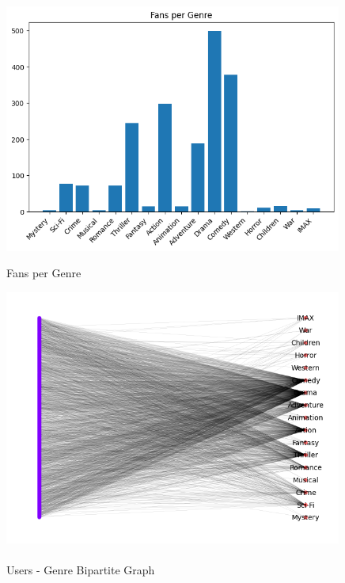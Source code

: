 \documentclass[12pt]{article}
\numberwithin{equation}{section}
\begin{document}
\begin{figure}[h!]
    \begin{minipage}[b]{0.49\linewidth}
         \centering
  	\includegraphics[width=0.99\textwidth]{fans_per_genre.png}
  	\label{fig:fanspergenre}
	 \caption{Fans per Genre}
    \end{minipage}
    \hspace{0.01 cm}
    \begin{minipage}[b]{0.49\linewidth}
         \centering
  	\includegraphics[width=0.99\textwidth]{genre_bipartite.png}
  	\caption{\\Users - Genre Bipartite Graph}
  	\label{fig:genre_bipartite}
    \end{minipage}
\end{figure}
\end{document}
